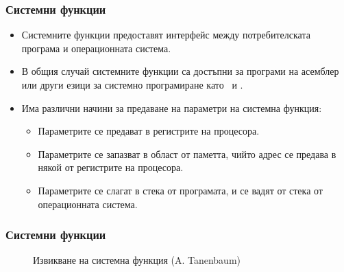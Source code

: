 \documentclass[ignorenonframetext, hyperref=unicode]{beamer}
\begin{document}
\begin{frame}[containsverbatim]
\frametitle{Системни функции}
\begin{itemize}
\item Системните функции предоставят интерфейс между потребителската програма и
операционната система.
\item В общия случай системните функции са достъпни за програми на асемблер или
други езици за системно програмиране като \CC\ и \Cpp.
\item Има различни начини за предаване на параметри на системна функция:
\begin{itemize}
  \item Параметрите се предават в регистрите на процесора.
  \item Параметрите се запазват в област от паметта, чийто адрес се предава в
  някой от регистрите на процесора.
  \item Параметрите се слагат в стека от програмата, и се вадят от стека от
  операционната система.
\end{itemize}
\end{itemize}
\end{frame}


\begin{frame}
\frametitle{Системни функции}
\begin{figure}[h]
\center
{}
\caption{Извикване на системна функция (A. Tanenbaum)}
\end{figure}
\end{frame}
\end{document}
